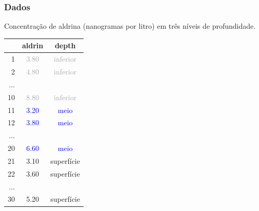 
\begin{frame}
\frametitle{Dados}
\justifying
Concentração de aldrina (nanogramas por litro) em três níveis de profundidade. \\

\begin{center}
\begin{tabular}{r | c | c}
\hline
 	& aldrin 					& depth \\ 
\hline
1 	& \textcolor{darkGray}{3.80} 	& \textcolor{darkGray}{inferior}  \\ 
2 	& \textcolor{darkGray}{4.80} 	& \textcolor{darkGray}{inferior}  \\ 
...	&						& \\
10	& \textcolor{darkGray}{8.80} 	& \textcolor{darkGray}{inferior} \\
11	& \textcolor{blue}{3.20} 		& \textcolor{blue}{meio}  \\
12	& \textcolor{blue}{3.80} 		& \textcolor{blue}{meio} \\
...	&						& \\
20 	& \textcolor{blue}{6.60} 		& \textcolor{blue}{meio} \\
21	& \textcolor{oiB}{3.10} 		& \textcolor{oiB}{superfície} \\
22	& \textcolor{oiB}{3.60} 		& \textcolor{oiB}{superfície} \\
...	&						& \\
30 	& \textcolor{oiB}{5.20} 		& \textcolor{oiB}{superfície} \\  
\hline
\end{tabular}
\end{center}

\end{frame}


